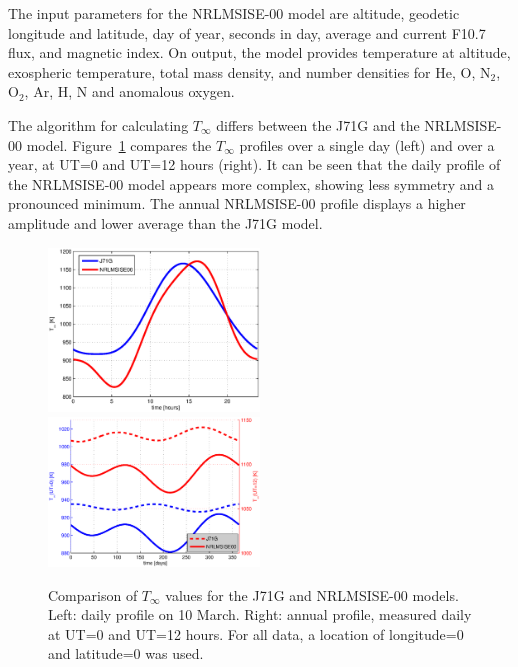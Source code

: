 \documentclass[Orbiter Technical Reference.tex]{subfiles}
\begin{document}
The input parameters for the NRLMSISE-00 model are altitude, geodetic longitude and latitude, day of year, seconds in day, average and current F10.7 flux, and magnetic index. On output, the model provides temperature at altitude, exospheric temperature, total mass density, and number densities for He, O, N$_2$, O$_2$, Ar, H, N and anomalous oxygen.

The algorithm for calculating $T_\infty$ differs between the J71G and the NRLMSISE-00 model. Figure~\ref{fig:comp_tinfty} compares the $T_\infty$ profiles over a single day (left) and over a year, at UT=0 and UT=12 hours (right). It can be seen that the daily profile of the NRLMSISE-00 model appears more complex, showing less symmetry and a pronounced minimum. The annual NRLMSISE-00 profile displays a higher amplitude and lower average than the J71G model.

\begin{figure}
\includegraphics[width=0.5\textwidth]{tinf_daily.eps}
\includegraphics[width=0.5\textwidth]{tinf_annual.eps}
\caption{Comparison of $T_\infty$ values for the J71G and NRLMSISE-00 models. Left: daily profile on 10 March. Right: annual profile, measured daily at UT=0 and UT=12 hours. For all data, a location of longitude=0 and latitude=0 was used.}
\label{fig:comp_tinfty}
\end{figure}
\end{document}
